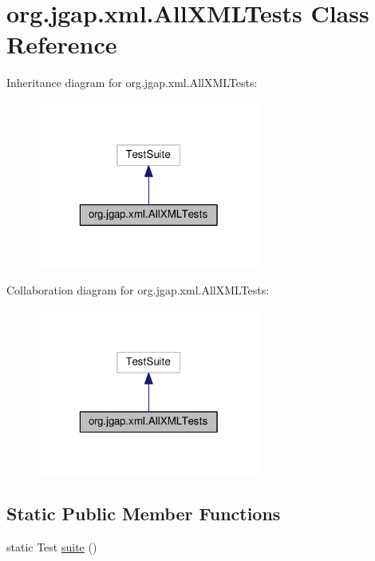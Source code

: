 \hypertarget{classorg_1_1jgap_1_1xml_1_1_all_x_m_l_tests}{\section{org.\-jgap.\-xml.\-All\-X\-M\-L\-Tests Class Reference}
\label{classorg_1_1jgap_1_1xml_1_1_all_x_m_l_tests}
}


Inheritance diagram for org.\-jgap.\-xml.\-All\-X\-M\-L\-Tests\-:
\nopagebreak
\begin{figure}[H]
\begin{center}
\leavevmode
\includegraphics[width=208pt]{classorg_1_1jgap_1_1xml_1_1_all_x_m_l_tests__inherit__graph}
\end{center}
\end{figure}


Collaboration diagram for org.\-jgap.\-xml.\-All\-X\-M\-L\-Tests\-:
\nopagebreak
\begin{figure}[H]
\begin{center}
\leavevmode
\includegraphics[width=208pt]{classorg_1_1jgap_1_1xml_1_1_all_x_m_l_tests__coll__graph}
\end{center}
\end{figure}
\subsection*{Static Public Member Functions}
\begin{DoxyCompactItemize}
\item 
static Test \hyperlink{classorg_1_1jgap_1_1xml_1_1_all_x_m_l_tests_af6664876ebb16d23853a8b371968ebc1}{suite} ()
\end{DoxyCompactItemize}
